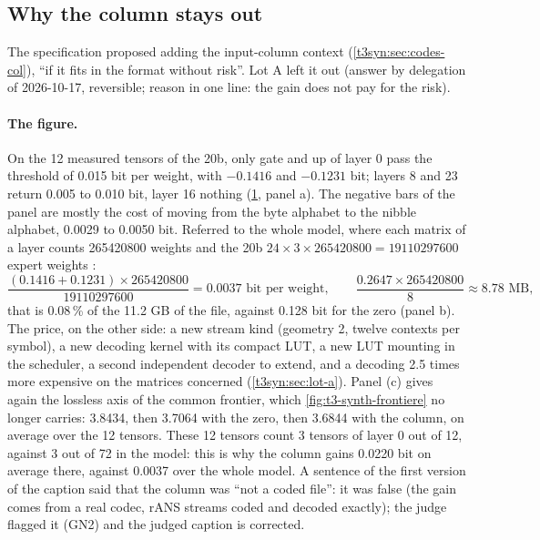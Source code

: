 \subsection{Why the column stays out}\label{t3cod:sec:colonne}

The specification proposed adding the input-column context (\cref{t3syn:sec:codes-col}), ``if it fits in the format without risk''. Lot A left it out (answer by delegation of 2026-10-17, reversible; reason in one line: the gain does not pay for the risk).

\begin{figure}[tbp]
\centering
\GrapheCodonColonne
{}
\label{fig:t3-codon-colonne}
\end{figure}

\paragraph{The figure.} On the 12 measured tensors of the 20b, only gate and up of layer 0 pass the threshold of 0.015 bit per weight, with $-0.1416$ and $-0.1231$ bit; layers 8 and 23 return 0.005 to 0.010 bit, layer 16 nothing (\cref{fig:t3-codon-colonne}, panel a). The negative bars of the panel are mostly the cost of moving from the byte alphabet to the nibble alphabet, 0.0029 to 0.0050 bit. Referred to the whole model, where each matrix of a layer counts \num{265420800} weights and the 20b $24 \times 3 \times \num{265420800} = \num{19110297600}$ expert weights \calc:
\[
\frac{(0.1416 + 0.1231) \times \num{265420800}}{\num{19110297600}} = 0.0037 \text{ bit per weight}, \qquad \frac{0.2647 \times \num{265420800}}{8} \approx 8.78 \text{ MB},
\]
that is 0.08\,\% of the 11.2 GB of the file, against 0.128 bit for the zero (panel b). The price, on the other side: a new stream kind (geometry 2, twelve contexts per symbol), a new decoding kernel with its compact LUT, a new LUT mounting in the scheduler, a second independent decoder to extend, and a decoding 2.5 times more expensive on the matrices concerned (\cref{t3syn:sec:lot-a}). Panel (c) gives again the lossless axis of the common frontier, which \cref{fig:t3-synth-frontiere} no longer carries: 3.8434, then 3.7064 with the zero, then 3.6844 with the column, on average over the 12 tensors. These 12 tensors count 3 tensors of layer 0 out of 12, against 3 out of 72 in the model: this is why the column gains 0.0220 bit on average there, against 0.0037 over the whole model. A sentence of the first version of the caption said that the column was ``not a coded file'': it was false (the gain comes from a real codec, rANS streams coded and decoded exactly); the judge flagged it (GN2) and the judged caption is corrected.

